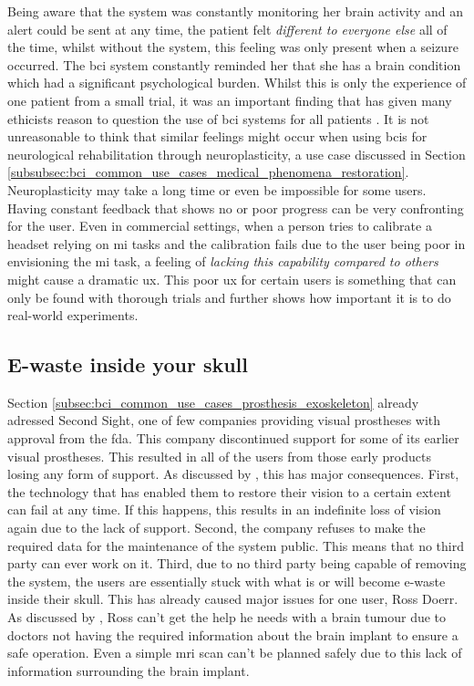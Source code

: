 Being aware that the system was constantly monitoring her brain activity and an alert could be sent at any time, the patient felt \textit{different to everyone else} all of the time, whilst without the system, this feeling was only present when a seizure occurred.
The \gls{bci} system constantly reminded her that she has a brain condition which had a significant psychological burden.
Whilst this is only the experience of one patient from a small trial, it was an important finding that has given many ethicists reason to question the use of \gls{bci} systems for all patients \citep{ethics_of_bci}.
It is not unreasonable to think that similar feelings might occur when using \glspl{bci} for neurological rehabilitation through neuroplasticity, a use case discussed in Section \ref{subsubsec:bci_common_use_cases_medical_phenomena_restoration}.
Neuroplasticity may take a long time or even be impossible for some users.
Having constant feedback that shows no or poor progress can be very confronting for the user.
Even in commercial settings, when a person tries to calibrate a headset relying on \gls{mi} tasks and the calibration fails due to the user being poor in envisioning the \gls{mi} task, a feeling of \textit{lacking this capability compared to others} might cause a dramatic \gls{ux}.
This poor \gls{ux} for certain users is something that can only be found with thorough trials and further shows how important it is to do real-world experiments.


\subsection{E-waste inside your skull}
\label{subsec:bci_ethical_e_waste}

Section \ref{subsec:bci_common_use_cases_prosthesis_exoskeleton} already adressed Second Sight, one of few companies providing visual prostheses with approval from the \gls{fda}.
This company discontinued support for some of its earlier visual prostheses.
This resulted in all of the users from those early products losing any form of support.
As discussed by \citet{second_sight_broken_ethics}, this has major consequences.
First, the technology that has enabled them to restore their vision to a certain extent can fail at any time.
If this happens, this results in an indefinite loss of vision again due to the lack of support.
Second, the company refuses to make the required data for the maintenance of the system public.
This means that no third party can ever work on it.
Third, due to no third party being capable of removing the system, the users are essentially stuck with what is or will become e-waste inside their skull.
This has already caused major issues for one user, Ross Doerr.
As discussed by \citet{second_sight_broken_ethics}, Ross can't get the help he needs with a brain tumour due to doctors not having the required information about the brain implant to ensure a safe operation.
Even a simple \gls{mri} scan can't be planned safely due to this lack of information surrounding the brain implant.

